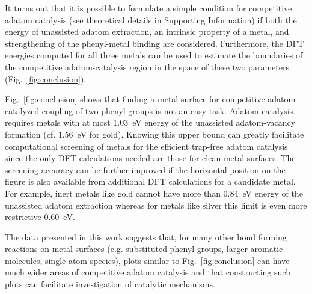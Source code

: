 \documentclass[aps,prb,amsmath,amssymb,11pt]{revtex4-1}
\newcommand{\comm}{\color{purple}} %
\newcommand{\sinfo}{Supporting Information}
\begin{document}
It turns out that it is possible to formulate a simple condition for competitive adatom catalysis (see theoretical details in \sinfo) if both the energy of unassisted adatom extraction, an intrinsic property of a metal, and strengthening of the phenyl-metal binding are considered. 
Furthermore, the DFT energies computed for all three metals can be used to estimate the boundaries of the competitive adatom-catalysis region in the space of these two parameters (Fig.~\ref{fig:conclusion}).

Fig.~\ref{fig:conclusion} shows that finding a metal surface for competitive adatom-catalyzed coupling of two phenyl groups is not an easy task. Adatom catalysis requires metals with at most \SI{1.03}{\electronvolt} energy of the unassisted adatom-vacancy formation (cf. \SI{1.56}{\electronvolt} for gold). Knowing this upper bound can greatly facilitate computational screening of metals for the efficient trap-free adatom catalysis since the only DFT calculations needed are those for clean metal surfaces. The screening accuracy can be further improved if the horizontal position on the figure is also available from additional DFT calculations for a candidate metal. For example, inert metals like gold cannot have more than \SI{0.84}{\electronvolt} energy of the unassisted adatom extraction whereas for metals like silver this limit is even more restrictive \SI{0.60}{\electronvolt}. 


The data presented in this work suggests that, for many other bond forming reactions on metal surfaces (e.g. substituted phenyl groups, larger aromatic molecules, single-atom species), plots similar to Fig.~\ref{fig:conclusion} can have much wider areas of competitive adatom catalysis and that constructing such plots can facilitate investigation of catalytic mechanisms. 


\end{document}
